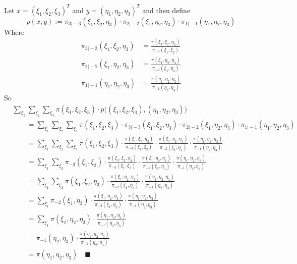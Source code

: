 \documentclass[11pt,letterpaper, leqno]{article}
\numberwithin{equation}{section}
\numberwithin{theorem}{section}
\numberwithin{lemma}{section}
\numberwithin{corollary}{section}
\numberwithin{definition}{section}
\numberwithin{proposition}{section}
\numberwithin{remark}{section}
\numberwithin{example}{section}
\renewcommand{\qed}{\quad \blacksquare}
\begin{document}
\begin{enumerate}
        Let $x = (\xi_1, \xi_2, \xi_3)^T$ and $y = (\eta_1, \eta_2, \eta_3)^T$ and then define
        \[\boxed{p(x, y) := \pi_{3\vert -3}(\xi_1, \xi_2, \eta_3) \cdot \pi_{2\vert -2}(\xi_1, \eta_2, \eta_3) \cdot \pi_{1\vert -1}(\eta_1, \eta_2, \eta_3)}\]  
        Where 
        \begin{align*}
            \pi_{3\vert -3}(\xi_1, \xi_2, \eta_3) &= \frac{\pi(\xi_1, \xi_2, \eta_3)}{\pi_{-3}(\xi_1, \xi_2)}\\
            \pi_{2\vert -2}(\xi_1, \eta_2, \eta_3) &= \frac{\pi(\xi_1, \eta_2, \eta_3)}{\pi_{-2}(\xi_1, \eta_3)}\\
            \pi_{1\vert -1}(\eta_1, \eta_2, \eta_3) &= \frac{\pi(\eta_1, \eta_2, \eta_3)}{\pi_{-1}(\eta_2, \eta_3)}
        \end{align*}
        So 
        \begin{align*}
            &\sum_{\xi_1} \sum_{\xi_2}\sum_{\xi_3} \pi(\xi_1,\xi_2,\xi_3) \cdot p\Big( (\xi_1,\xi_2,\xi_3), (\eta_1,\eta_2,\eta_3)\Big)\\
            &\qquad = \sum_{\xi_1}\sum_{\xi_2}\sum_{\xi_3} \pi(\xi_1,\xi_2,\xi_3) \cdot \pi_{3\vert -3}(\xi_1, \xi_2, \eta_3) \cdot \pi_{2\vert -2}(\xi_1, \eta_2, \eta_3) \cdot \pi_{1\vert -1}(\eta_1, \eta_2, \eta_3)\\
            &\qquad = \sum_{\xi_1}\sum_{\xi_2}\sum_{\xi_3} \pi(\xi_1,\xi_2,\xi_3) \cdot \frac{\pi(\xi_1, \xi_2, \eta_3)}{\pi_{-3}(\xi_1, \xi_2)} \cdot \frac{\pi(\xi_1, \eta_2, \eta_3)}{\pi_{-2}(\xi_1, \eta_3)} \cdot \frac{\pi(\eta_1, \eta_2, \eta_3)}{\pi_{-1}(\eta_2, \eta_3)}\\
            &\qquad = \sum_{\xi_1}\sum_{\xi_2} \pi_{-3}(\xi_1, \xi_2) \cdot \frac{\pi(\xi_1, \xi_2, \eta_3)}{\pi_{-3}(\xi_1, \xi_2)} \cdot \frac{\pi(\xi_1, \eta_2, \eta_3)}{\pi_{-2}(\xi_1, \eta_3)} \cdot \frac{\pi(\eta_1, \eta_2, \eta_3)}{\pi_{-1}(\eta_2, \eta_3)}\\
            &\qquad = \sum_{\xi_1}\sum_{\xi_2} \pi(\xi_1, \xi_2, \eta_3) \cdot \frac{\pi(\xi_1, \eta_2, \eta_3)}{\pi_{-2}(\xi_1, \eta_3)} \cdot \frac{\pi(\eta_1, \eta_2, \eta_3)}{\pi_{-1}(\eta_2, \eta_3)}\\
            &\qquad = \sum_{\xi_1} \pi_{-2}(\xi_1, \eta_3) \cdot \frac{\pi(\xi_1, \eta_2, \eta_3)}{\pi_{-2}(\xi_1, \eta_3)} \cdot \frac{\pi(\eta_1, \eta_2, \eta_3)}{\pi_{-1}(\eta_2, \eta_3)}\\
            &\qquad = \sum_{\xi_1}\pi(\xi_1, \eta_2, \eta_3) \cdot \frac{\pi(\eta_1, \eta_2, \eta_3)}{\pi_{-1}(\eta_2, \eta_3)}\\
            &\qquad = \pi_{-1}(\eta_2, \eta_3) \cdot \frac{\pi(\eta_1, \eta_2, \eta_3)}{\pi_{-1}(\eta_2, \eta_3)}\\
            &\qquad = \pi(\eta_1, \eta_2, \eta_3) \qed
        \end{align*}
    \color{black}

\end{enumerate}


%

\end{document}
